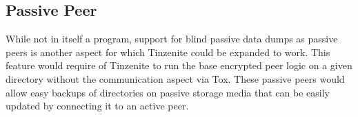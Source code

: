 \subsection{Passive Peer}

While not in itself a program, support for blind passive data dumps as passive peers is another aspect for which Tinzenite could be expanded to work.
This feature would require of Tinzenite to run the base encrypted peer logic on a given directory without the communication aspect via Tox.
These passive peers would allow easy backups of directories on passive storage media that can be easily updated by connecting it to an active peer.
